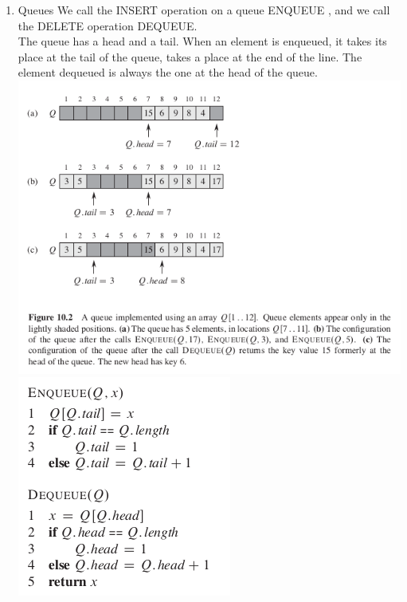 \documentclass[11pt]{article}
\begin{document}
\begin{enumerate}
\item Queues
\label{sec-4-1-1-2}
We call the INSERT operation on a queue ENQUEUE , and we call the DELETE operation DEQUEUE. \\

The queue has a head and a tail. When an element is enqueued, it takes its place at the tail of the queue, takes a place at the end of the line. The element dequeued is always the one at the head of the queue. \\

\includegraphics[width=.9\linewidth]{pics/c10_queue_fig.png} \\

\includegraphics[width=.9\linewidth]{pics/c10_queue.png} \\
\end{enumerate}
\end{document}

